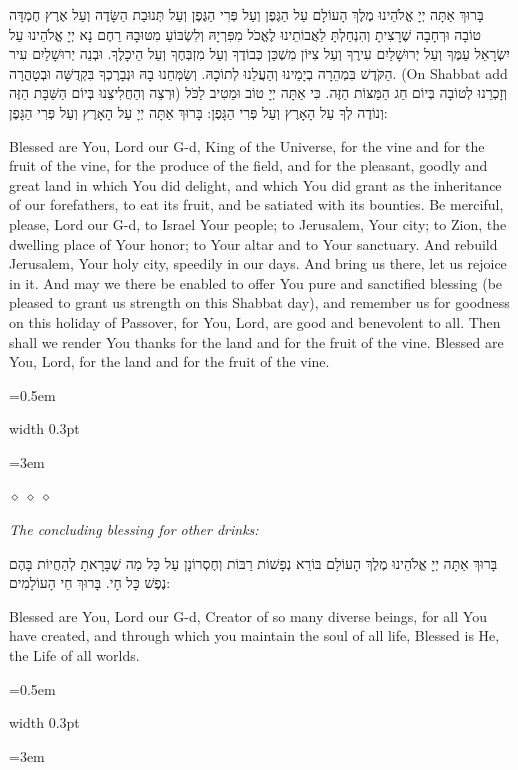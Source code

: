 \documentclass[11pt, openany]{book}
\newcommand{\instruction}[1]{%
  \par\vspace{3pt}
  \begin{tcolorbox}[
    enhanced,
    breakable,
    colback=sederlight,
    colframe=sederlight,
    boxrule=0pt,
    left=10pt,
    right=6pt,
    top=4pt,
    bottom=4pt,
    borderline west={2pt}{0pt}{sederwine!60},
    arc=0pt,
    outer arc=0pt,
  ]
    {\small\itshape\textcolor{sederwine}{#1}}
  \end{tcolorbox}
  \par\vspace{2pt}
}
\newlength{\bidiHebWidth}
\newlength{\bidiEngWidth}
\newenvironment{bilingual}{%
  \par\vspace{4pt}%
}{%
  \noindent
  \begin{minipage}[t]{\bidiEngWidth}
    \setstretch{1.4}\emergencystretch=0.5em\normalsize
    \usebox{\bidiEngBox}
  \end{minipage}%
  \hfill
  {\color{sedergold}\vrule width 0.3pt}%
  \hfill
  \begin{minipage}[t]{\bidiHebWidth}
    \begingroup\hebrewfont\TeXXeTstate=1\beginR
    \large\setstretch{1.4}\emergencystretch=3em\tolerance=9999\parindent=0pt\relax
    \usebox{\bidiHebBox}
    \endR\endgroup
  \end{minipage}%
  \par\vspace{2pt}%
}
\newenvironment{hebrewcol}{%
  \begin{lrbox}{\bidiHebBox}\begin{minipage}{\bidiHebWidth}%
}{%
  \end{minipage}\end{lrbox}%
}
\newenvironment{englishcol}{%
  \begin{lrbox}{\bidiEngBox}\begin{minipage}{\bidiEngWidth}%
}{%
  \end{minipage}\end{lrbox}%
}
\newcommand{\parasep}{%
  \par\vspace{3pt}
  \begin{center}
    \textcolor{sedergold!50}{\tiny$\diamond\;\diamond\;\diamond$}
  \end{center}
  \par\vspace{3pt}
}
\begin{document}
\begin{bilingual}
\begin{hebrewcol}
בָּרוּךְ אַתָּה יְיָ אֱלֹהֵינוּ מֶלֶךְ הָעוֹלָם עַל הַגֶּפֶן וְעַל פְּרִי הַגֶּפֶן וְעַל תְּנוּבַת הַשָּׂדֶה וְעַל אֶרֶץ חֶמְדָּה טוֹבָה וּרְחָבָה שֶׁרָצִיתָ וְהִנְחַלְתָּ לַאֲבוֹתֵינוּ לֶאֱכֹל מִפִּרְיָהּ וְלִשְׂבּוֹעַ מִטּוּבָהּ רַחֶם נָא יְיָ אֱלֹהֵינוּ עַל יִשְׂרָאֵל עַמֶּךָ וְעַל יְרוּשָׁלַיִם עִירֶךָ וְעַל צִיּוֹן מִשְׁכַּן כְּבוֹדֶךָ וְעַל מִזְבְּחֶךָ וְעַל הֵיכָלֶךָ. וּבְנֵה יְרוּשָׁלַיִם עִיר הַקֹּדֶשׁ בִּמְהֵרָה בְיָמֵינוּ וְהַעֲלֵנוּ לְתוֹכָהּ. וְשַׂמְּחֵנוּ בָהּ וּנְבָרֶכְךָ בִּקְדֻשָּׁה וּבְטָהֳרָה. (On Shabbat add וּרְצֵה וְהַחֲלִיצֵנוּ בְּיוֹם הַשַּׁבָּת הַזֶּה) וְזָכְרֵנוּ לְטוֹבָה בְּיוֹם חַג הַמַּצּוֹת הַזֶּה. כִּי אַתָּה יְיָ טוֹב וּמֵטִיב לַכֹּל וְנוֹדֶה לְךָ עַל הָאָרֶץ וְעַל פְּרִי הַגָּפֶן: בָּרוּךְ אַתָּה יְיָ עַל הָאָרֶץ וְעַל פְּרִי הַגָּפֶן:
\end{hebrewcol}
\begin{englishcol}
Blessed are You, Lord our G-d, King of the Universe, for the vine and for the fruit of the vine, for the produce of the field, and for the pleasant, goodly and great land in which You did delight, and which You did grant as the inheritance of our forefathers, to eat its fruit, and be satiated with its bounties. Be merciful, please, Lord our G-d, to Israel Your people; to Jerusalem, Your city; to Zion, the dwelling place of Your honor; to Your altar and to Your sanctuary. And rebuild Jerusalem, Your holy city, speedily in our days. And bring us there, let us rejoice in it. And may we there be enabled to offer You pure and sanctified blessing (be pleased to grant us strength on this Shabbat day), and remember us for goodness on this holiday of Passover, for You, Lord, are good and benevolent to all. Then shall we render You thanks for the land and for the fruit of the vine. Blessed are You, Lord, for the land and for the fruit of the vine.
\end{englishcol}
\end{bilingual}
\parasep

\instruction{The concluding blessing for other drinks:}

\begin{bilingual}
\begin{hebrewcol}
בָּרוּךְ אַתָּה יְיָ אֱלֹהֵינוּ מֶלֶךְ הָעוֹלָם בּוֹרֵא נְפָשׁוֹת רַבּוֹת וְחֶסְרוֹנָן עַל כָּל מַה שֶׁבָּרָאתָ לְהַחֲיוֹת בָּהֶם נֶפֶשׁ כָּל חָי. בָּרוּךְ חֵי הָעוֹלָמִים:
\end{hebrewcol}
\begin{englishcol}
Blessed are You, Lord our G-d, Creator of so many diverse beings, for all You have created, and through which you maintain the soul of all life, Blessed is He, the Life of all worlds.
\end{englishcol}
\end{bilingual}
\vspace{10pt}
\begin{center}
\textcolor{sedergold}{}
\end{center}
\vspace{6pt}
\end{document}
